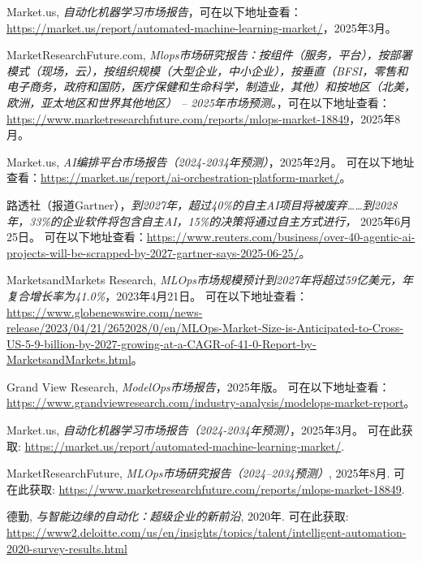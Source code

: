 \documentclass[11pt, a4paper, oneside]{article}
\begin{document}
\newpage
\begin{thebibliography}{99}
    Market.us, \textit{自动化机器学习市场报告}，可在以下地址查看：\url{https://market.us/report/automated-machine-learning-market/}，2025年3月。
    
    MarketResearchFuture.com, \textit{Mlops市场研究报告：按组件（服务，平台），按部署模式（现场，云），按组织规模（大型企业，中小企业），按垂直（BFSI，零售和电子商务，政府和国防，医疗保健和生命科学，制造业，其他）和按地区（北美，欧洲，亚太地区和世界其他地区） – 2025年市场预测。}，可在以下地址查看：\url{https://www.marketresearchfuture.com/reports/mlops-market-18849}，2025年8月。
    
    Market.us, \textit{AI编排平台市场报告（2024-2034年预测）}，2025年2月。  
    可在以下地址查看：\url{https://market.us/report/ai-orchestration-platform-market/}。

    路透社（报道Gartner），\textit{到2027年，超过40\%的自主AI项目将被废弃……到2028年，33\%的企业软件将包含自主AI，15\%的决策将通过自主方式进行，} 2025年6月25日。  
    可在以下地址查看：\url{https://www.reuters.com/business/over-40-agentic-ai-projects-will-be-scrapped-by-2027-gartner-says-2025-06-25/}。

    MarketsandMarkets Research, \textit{MLOps市场规模预计到2027年将超过59亿美元，年复合增长率为41.0\%}，2023年4月21日。  
    可在以下地址查看：\url{https://www.globenewswire.com/news-release/2023/04/21/2652028/0/en/MLOps-Market-Size-is-Anticipated-to-Cross-US-5-9-billion-by-2027-growing-at-a-CAGR-of-41-0-Report-by-MarketsandMarkets.html}。

    Grand View Research, \textit{ModelOps市场报告}，2025年版。  
    可在以下地址查看：\url{https://www.grandviewresearch.com/industry-analysis/modelops-market-report}。

    Market.us, \textit{自动化机器学习市场报告（2024-2034年预测）}，2025年3月。
    可在此获取: \url{https://market.us/report/automated-machine-learning-market/}.

    MarketResearchFuture, \textit{MLOps市场研究报告（2024--2034预测）}, 2025年8月.  
    可在此获取: \url{https://www.marketresearchfuture.com/reports/mlops-market-18849}.

    德勤, \textit{与智能边缘的自动化：超级企业的新前沿}, 2020年. 可在此获取: \url{https://www2.deloitte.com/us/en/insights/topics/talent/intelligent-automation-2020-survey-results.html}


\end{thebibliography}
\end{document}

